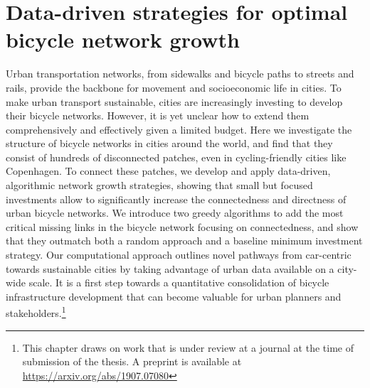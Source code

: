 \chapter{Data-driven strategies for optimal bicycle network growth}

Urban transportation networks, from sidewalks and bicycle paths to streets and rails, provide the backbone for movement and socioeconomic life in cities. To make urban transport sustainable, cities are increasingly investing to develop their bicycle networks. However, it is yet unclear how to extend them comprehensively and effectively given a limited budget. Here we investigate the structure of bicycle networks in cities around the world, and find that they consist of hundreds of disconnected patches, even in cycling-friendly cities like Copenhagen. To connect these patches, we develop and apply data-driven, algorithmic network growth strategies, showing that small but focused investments allow to significantly increase the connectedness and directness of urban bicycle networks. We introduce two greedy algorithms to add the most critical missing links in the bicycle network focusing on connectedness, and show that they outmatch both a random approach and a baseline minimum investment strategy. Our computational approach outlines novel pathways from car-centric towards sustainable cities by taking advantage of urban data available on a city-wide scale. It is a first step towards a quantitative consolidation of bicycle infrastructure development that can become valuable for urban planners and stakeholders.\footnote{This chapter draws on work that is under review at a journal at the time of submission of the thesis. A preprint is available at \url{https://arxiv.org/abs/1907.07080}}



